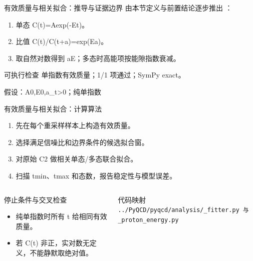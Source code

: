\begin{frame}[t]{有效质量与相关拟合：推导与证据边界}
\footnotesize
{}\quad 由本节定义与前置结论逐步推出 ：
\begin{enumerate}
\item 单态 C(t)=Aexp(-Et)。
\item 比值 C(t)/\allowbreak{}C(t+a)=exp(Ea)。
\item 取自然对数得到 aE；多态时高能项按能隙指数衰减。
\end{enumerate}\begin{block}{可执行检查}
\quad 单指数有效质量；1/1 项通过；SymPy exact。
\par\scriptsize 假设：A0,E0,a\_t>0；纯单指数
\end{block}
\end{frame}

\begin{frame}[t]{有效质量与相关拟合：计算算法}
\footnotesize
{}\begin{enumerate}
\item 先在每个重采样样本上构造有效质量。
\item 选择满足信噪比和边界条件的候选拟合窗。
\item 对原始 C2 做相关单态/\allowbreak{}多态联合拟合。
\item 扫描 tmin、tmax 和态数，报告稳定性与模型误差。
\end{enumerate}\begin{columns}[T,onlytextwidth]
\begin{block}{停止条件与交叉检查}\scriptsize\begin{itemize}
\item[\CheckMark] 纯单指数时所有 t 给相同有效质量。
\item[\CheckMark] 若 C(t) 非正，实对数无定义，不能静默取绝对值。
\end{itemize}\end{block}
\begin{block}{代码映射}
\scriptsize \texttt{.\allowbreak{}.\allowbreak{}/\allowbreak{}PyQCD/\allowbreak{}pyqcd/\allowbreak{}analysis/\allowbreak{}\_\allowbreak{}fitter.\allowbreak{}py 与 \_\allowbreak{}proton\_\allowbreak{}energy.\allowbreak{}py}
\end{block}\end{columns}\end{frame}

